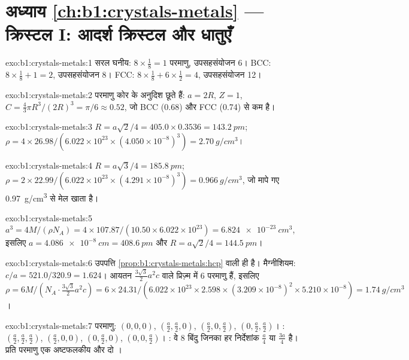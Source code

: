 \section*{अध्याय \ref{ch:b1:crystals-metals} --- क्रिस्टल I: आदर्श क्रिस्टल और धातुएँ}

\begin{solution}{exo:b1:crystals-metals:1}
सरल घनीय: $8 \times \frac18 = 1$ परमाणु, उपसहसंयोजन 6। BCC: $8 \times
\frac18 + 1 = 2$, उपसहसंयोजन 8। FCC: $8 \times \frac18 + 6 \times
\frac12 = 4$, उपसहसंयोजन 12।
\end{solution}

\begin{solution}{exo:b1:crystals-metals:2}
परमाणु कोर के अनुदिश छूते हैं: $a = 2R$, $Z = 1$, $C = \frac43\pi R^3/(2R)^3
= \pi/6 \approx 0.52$, जो BCC (0.68) और FCC (0.74) से कम है।
\end{solution}

\begin{solution}{exo:b1:crystals-metals:3}
$R = a\sqrt2/4 = 405.0 \times 0.3536 = \qty{143.2}{pm}$;
$\rho = 4 \times 26.98/(6.022 \times 10^{23} \times (4.050 \times
10^{-8})^3) = \qty{2.70}{g/cm^3}$।
\end{solution}

\begin{solution}{exo:b1:crystals-metals:4}
$R = a\sqrt3/4 = \qty{185.8}{pm}$; $\rho = 2 \times 22.99/(6.022 \times
10^{23} \times (4.291 \times 10^{-8})^3) = \qty{0.966}{g/cm^3}$, जो
मापे गए \qty{0.97}{g/cm^3} से मेल खाता है।
\end{solution}

\begin{solution}{exo:b1:crystals-metals:5}
$a^3 = 4M/(\rho N_A) = 4 \times 107.87/(10.50 \times 6.022 \times 10^{23}) =
\qty{6.824e-23}{cm^3}$, इसलिए $a = \qty{4.086e-8}{cm} = \qty{408.6}{pm}$ और
$R = a\sqrt2/4 = \qty{144.5}{pm}$।
\end{solution}

\begin{solution}{exo:b1:crystals-metals:6}
उपपत्ति \cref{prop:b1:crystals-metals:hcp} वाली ही है। मैग्नीशियम:
$c/a = 521.0/320.9 = 1.624$। आयतन
$\frac{3\sqrt3}{2}a^2c$ वाले प्रिज़्म में 6 परमाणु हैं, इसलिए $\rho = 6M/(N_A \cdot
\frac{3\sqrt3}{2}a^2c) = 6 \times 24.31/(6.022 \times 10^{23} \times
2.598 \times (3.209 \times 10^{-8})^2 \times 5.210 \times 10^{-8}) =
\qty{1.74}{g/cm^3}$।
\end{solution}

\begin{solution}{exo:b1:crystals-metals:7}
परमाणु: $(0,0,0)$, $(\frac a2,\frac a2,0)$, $(\frac a2,0,\frac a2)$,
$(0,\frac a2,\frac a2)$। : $(\frac a2,\frac a2,\frac a2)$,
$(\frac a2,0,0)$, $(0,\frac a2,0)$, $(0,0,\frac a2)$। : वे
8 बिंदु जिनका हर निर्देशांक $\frac a4$ या $\frac{3a}{4}$ है। प्रति परमाणु एक
अष्टफलकीय और दो ।
\end{solution}

